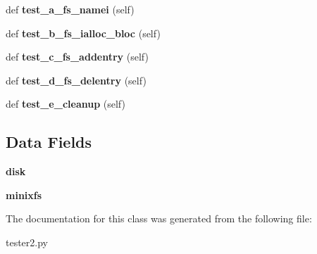 \begin{DoxyCompactItemize}
\item 
\hypertarget{classtester2_1_1_minix_tester_a2d40ca23d704b6a3dba89feaaa46ef4e}{}def {\bfseries test\+\_\+a\+\_\+fs\+\_\+namei} (self)\label{classtester2_1_1_minix_tester_a2d40ca23d704b6a3dba89feaaa46ef4e}

\item 
\hypertarget{classtester2_1_1_minix_tester_aff18c3a4f0015a9a7b9a077ee489a1c4}{}def {\bfseries test\+\_\+b\+\_\+fs\+\_\+ialloc\+\_\+bloc} (self)\label{classtester2_1_1_minix_tester_aff18c3a4f0015a9a7b9a077ee489a1c4}

\item 
\hypertarget{classtester2_1_1_minix_tester_a98f3830996534231f31445b8682a5cec}{}def {\bfseries test\+\_\+c\+\_\+fs\+\_\+addentry} (self)\label{classtester2_1_1_minix_tester_a98f3830996534231f31445b8682a5cec}

\item 
\hypertarget{classtester2_1_1_minix_tester_a098038e121b2415dbec422f5604bf94c}{}def {\bfseries test\+\_\+d\+\_\+fs\+\_\+delentry} (self)\label{classtester2_1_1_minix_tester_a098038e121b2415dbec422f5604bf94c}

\item 
\hypertarget{classtester2_1_1_minix_tester_a97a872c974641d654f3c414bf46678e8}{}def {\bfseries test\+\_\+e\+\_\+cleanup} (self)\label{classtester2_1_1_minix_tester_a97a872c974641d654f3c414bf46678e8}

\end{DoxyCompactItemize}
\subsection*{Data Fields}
\begin{DoxyCompactItemize}
\item 
\hypertarget{classtester2_1_1_minix_tester_a36c7b5664c44733896398e42189f7c6f}{}{\bfseries disk}\label{classtester2_1_1_minix_tester_a36c7b5664c44733896398e42189f7c6f}

\item 
\hypertarget{classtester2_1_1_minix_tester_afbd779c08c2307f759986f8ade741268}{}{\bfseries minixfs}\label{classtester2_1_1_minix_tester_afbd779c08c2307f759986f8ade741268}

\end{DoxyCompactItemize}


The documentation for this class was generated from the following file\+:\begin{DoxyCompactItemize}
\item 
tester2.\+py\end{DoxyCompactItemize}
